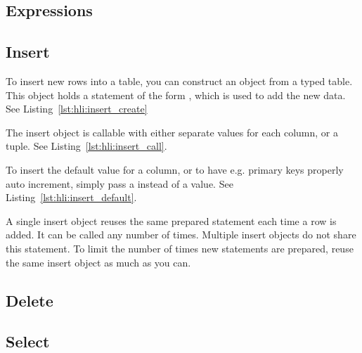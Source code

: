 

\subsection{Expressions}
\label{section:hli:expression}


\subsection{Insert}
\label{section:hli:insert}

To insert new rows into a table, you can construct an  object from a typed table. This object holds a statement of the form , which is used to add the new data. See Listing~\ref{lst:hli:insert_create}



The insert object is callable with either separate values for each column, or a tuple. See Listing~\ref{lst:hli:insert_call}.



To insert the default value for a column, or to have e.g. primary keys properly auto increment, simply pass a  instead of a value. See Listing~\ref{lst:hli:insert_default}.



A single insert object reuses the same prepared statement each time a row is added. It can be called any number of times. Multiple insert objects do not share this statement. To limit the number of times new statements are prepared, reuse the same insert object as much as you can.

\subsection{Delete}
\label{section:hli:delete}

\subsection{Select}
\label{section:hli:select}


